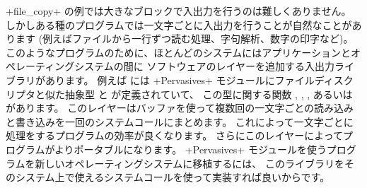\ml+file_copy+ の例では大きなブロックで入出力を行うのは難しくありません。
しかしある種のプログラムでは一文字ごとに入出力を行うことが自然なことがあります
(例えばファイルから一行ずつ読む処理、字句解析、数字の印字など)。
このようなプログラムのために、ほとんどのシステムにはアプリケーションとオペレーティングシステムの間に
ソフトウェアのレイヤーを追加する入出力ライブラリがあります。
例えば \ocaml には \ml+Pervasives+ モジュールにファイルディスクリプタと似た抽象型
 と  が定義されていて、
この型に関する関数 ,
,
, あるいは
 があります。
このレイヤーはバッファを使って複数回の一文字ごとの読み込みと書き込みを一回のシステムコールにまとめます。
これによって一文字ごとに処理をするプログラムの効率が良くなります。
さらにこのレイヤーによってプログラムがよりポータブルになります。
\ml+Pervasives+ モジュールを使うプログラムを新しいオペレーティングシステムに移植するには、
このライブラリをそのシステム上で使えるシステムコールを使って実装すれば良いからです。


